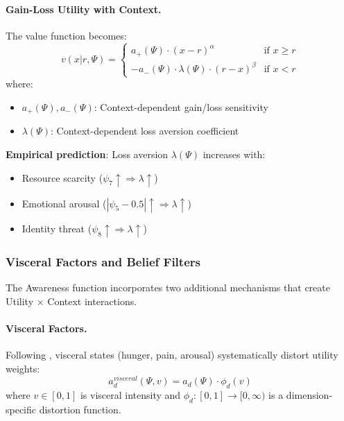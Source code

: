 \paragraph{Gain-Loss Utility with Context.}

The value function becomes:
\begin{equation}
v(x | r, \Psi) = \begin{cases}
a_+(\Psi) \cdot (x - r)^\alpha & \text{if } x \geq r \\
-a_-(\Psi) \cdot \lambda(\Psi) \cdot (r - x)^\beta & \text{if } x < r
\end{cases}
\end{equation}
where:
\begin{itemize}
    \item $a_+(\Psi), a_-(\Psi)$: Context-dependent gain/loss sensitivity
    \item $\lambda(\Psi)$: Context-dependent loss aversion coefficient
\end{itemize}

\textbf{Empirical prediction}: Loss aversion $\lambda(\Psi)$ increases with:
\begin{itemize}
    \item Resource scarcity ($\psi_7 \uparrow \Rightarrow \lambda \uparrow$)
    \item Emotional arousal ($|\psi_5 - 0.5| \uparrow \Rightarrow \lambda \uparrow$)
    \item Identity threat ($\psi_8 \uparrow \Rightarrow \lambda \uparrow$)
\end{itemize}

\subsubsection{Visceral Factors and Belief Filters}

The Awareness function incorporates two additional mechanisms that create 
Utility $\times$ Context interactions.

\paragraph{Visceral Factors.}

Following \citet{PAP-loewenstein2000emotions}, visceral states (hunger, pain, arousal) 
systematically distort utility weights:
\begin{equation}
a_d^{visceral}(\Psi, v) = a_d(\Psi) \cdot \phi_d(v)
\end{equation}
where $v \in [0,1]$ is visceral intensity and $\phi_d: [0,1] \to [0, \infty)$ is 
a dimension-specific distortion function.

